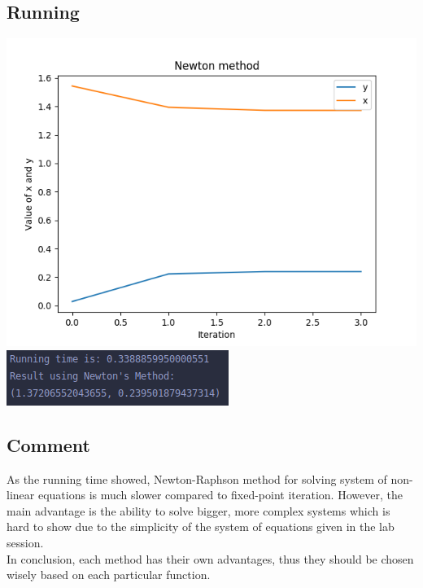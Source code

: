 \documentclass[12pt]{article}
\begin{document}
      \subsection*{Running}
      \begin{center}
        \includegraphics{NewtonRaphson.png}
        \includegraphics{NewtonRaphsonResult.png}
      \end{center}
      \subsection*{Comment}
        As the running time showed, Newton-Raphson method for solving system of non-linear
      equations is much slower compared to fixed-point iteration.
        However, the main advantage is the ability to solve bigger, more complex systems which
      is hard to show due to the simplicity of the system of equations given in the lab session. \\
        In conclusion, each method has their own advantages, thus they should be chosen wisely based
      on each particular function.
  
\end{document}
